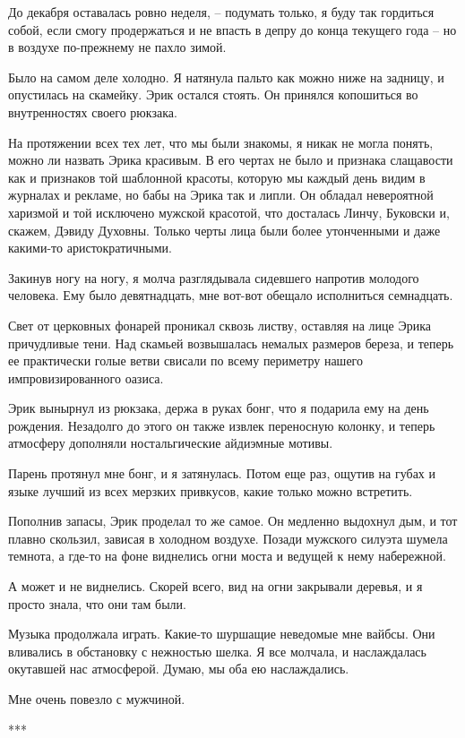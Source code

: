 \documentclass[
]{book}
\begin{document}
До декабря оставалась ровно неделя, -- подумать только, я буду так гордиться собой, если смогу продержаться и не впасть в депру до конца текущего года -- но в воздухе по-прежнему не пахло зимой.

Было на самом деле холодно. Я натянула пальто как можно ниже на задницу, и опустилась на скамейку. Эрик остался стоять. Он принялся копошиться во внутренностях своего рюкзака.

На протяжении всех тех лет, что мы были знакомы, я никак не могла понять, можно ли назвать Эрика красивым. В его чертах не было и признака слащавости как и признаков той шаблонной красоты, которую мы каждый день видим в журналах и рекламе, но бабы на Эрика так и липли. Он обладал невероятной харизмой и той исключено мужской красотой, что досталась Линчу, Буковски и, скажем, Дэвиду Духовны. Только черты лица были более утонченными и даже какими-то аристократичными.

Закинув ногу на ногу, я молча разглядывала сидевшего напротив молодого человека. Ему было девятнадцать, мне вот-вот обещало исполниться семнадцать.

Свет от церковных фонарей проникал сквозь листву, оставляя на лице Эрика причудливые тени. Над скамьей возвышалась немалых размеров береза, и теперь ее практически голые ветви свисали по всему периметру нашего импровизированного оазиса.

Эрик вынырнул из рюкзака, держа в руках бонг, что я подарила ему на день рождения. Незадолго до этого он также извлек переносную колонку, и теперь атмосферу дополняли ностальгические айдиэмные мотивы.

Парень протянул мне бонг, и я затянулась. Потом еще раз, ощутив на губах и языке лучший из всех мерзких привкусов, какие только можно встретить.

Пополнив запасы, Эрик проделал то же самое. Он медленно выдохнул дым, и тот плавно скользил, зависая в холодном воздухе. Позади мужского силуэта шумела темнота, а где-то на фоне виднелись огни моста и ведущей к нему набережной.

А может и не виднелись. Скорей всего, вид на огни закрывали деревья, и я просто знала, что они там были.

Музыка продолжала играть. Какие-то шуршащие неведомые мне вайбсы. Они вливались в обстановку с нежностью шелка. Я все молчала, и наслаждалась окутавшей нас атмосферой. Думаю, мы оба ею наслаждались.

Мне очень повезло с мужчиной.

***
\end{document}
